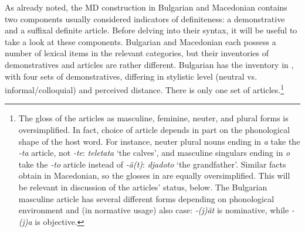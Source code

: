 \documentclass[output=paper,
colorlinks,
citecolor=brown,
newtxmath
]{langscibook}
\begin{document}
As already noted, the MD construction in Bulgarian and Macedonian contains two components usually considered indicators of definiteness: a demonstrative and a suffixal definite article. Before delving into their syntax, it will be useful to take a look at these components. Bulgarian and Macedonian each possess a number of lexical items in the relevant categories, but their inventories of demonstratives and articles are rather different.  Bulgarian has the inventory in , with four sets of demonstratives, differing in stylistic level (neutral vs. informal/colloquial) and perceived distance. There is only one set of articles.\footnote{\label{form}The gloss of the articles as masculine, feminine, neuter, and plural forms is oversimplified. In fact, choice of article depends in part on the phonological shape of the host word. For instance, neuter plural nouns ending in \textit{a} take the \textit{-ta} article, not \textit{-te}: \textit{teletata} `the calves', and masculine singulars ending in \textit{o} take the \textit{-to} article instead of \textit{-ă(t)}: \textit{djadoto} `the grandfather'. Similar facts obtain in Macedonian, so the glosses in  are equally oversimplified. This will be relevant in discussion of the articles' status, below. The Bulgarian masculine article has several different forms depending on phonological environment and (in normative usage) also case: \textit{-(j)ăt} is nominative, while \textit{-(j)a} is objective.}

\end{document}
